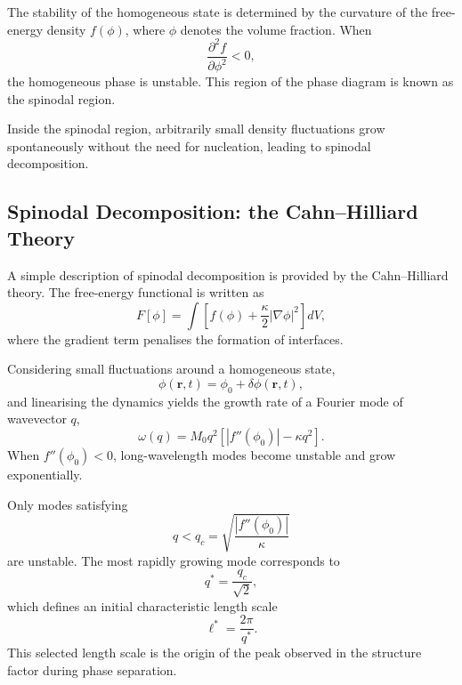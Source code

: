 \documentclass[11pt,a4paper]{article}
\begin{document}
The stability of the homogeneous state is determined by the curvature of the free-energy density $f(\phi)$, where $\phi$ denotes the volume fraction. When
\begin{equation}
    \frac{\partial^2 f}{\partial \phi^2} < 0,
\end{equation}
the homogeneous phase is unstable. This region of the phase diagram is known as the spinodal region.

Inside the spinodal region, arbitrarily small density fluctuations grow spontaneously without the need for nucleation, leading to spinodal decomposition.

\subsection{Spinodal Decomposition: the Cahn--Hilliard Theory}

A simple description of spinodal decomposition is provided by the Cahn--Hilliard theory. The free-energy functional is written as
\begin{equation}
    F[\phi]
    =
    \int
    \left[
    f(\phi)
    +
    \frac{\kappa}{2}|\nabla\phi|^2
    \right]dV,
\end{equation}
where the gradient term penalises the formation of interfaces.

Considering small fluctuations around a homogeneous state,
\begin{equation}
    \phi(\mathbf r,t)
    =
    \phi_0 + \delta\phi(\mathbf r,t),
\end{equation}
and linearising the dynamics yields the growth rate of a Fourier mode of wavevector $q$,
\begin{equation}
    \omega(q)
    =
    M_0 q^2
    \left[
    |f''(\phi_0)|
    -
    \kappa q^2
    \right].
    \label{eq:cahn_growth}
\end{equation}
When $f''(\phi_0)<0$, long-wavelength modes become unstable and grow exponentially.

Only modes satisfying
\begin{equation}
    q < q_c = \sqrt{\frac{|f''(\phi_0)|}{\kappa}}
\end{equation}
are unstable. The most rapidly growing mode corresponds to
\begin{equation}
    q^* = \frac{q_c}{\sqrt{2}},
\end{equation}
which defines an initial characteristic length scale
\begin{equation}
    \ell^* = \frac{2\pi}{q^*}.
\end{equation}
This selected length scale is the origin of the peak observed in the structure factor during phase separation.
\end{document}
